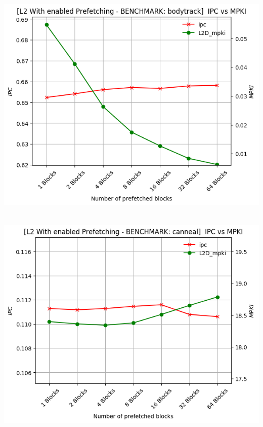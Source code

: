 \begin{minipage}{\textwidth}
    \begin{center}
        \\
        \vspace{3mm}
        \includegraphics[scale=0.70]{graphs/PREF/bodytrack.png}
        \vspace{6mm}
    \end{center}
\end{minipage}

\begin{minipage}{\textwidth}
    \begin{center}
        \\
        \vspace{3mm}
        \includegraphics[scale=0.70]{graphs/PREF/canneal.png}
        \vspace{6mm}
    \end{center}
\end{minipage}

